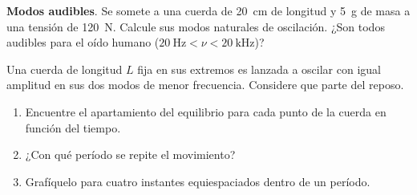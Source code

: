 \item \textbf{Modos audibles}.
Se somete a una cuerda de \SI{20}{\centi\metre} de longitud y \SI{5}{\gram} de masa a una tensión de \SI{120}{\newton}.
Calcule sus modos naturales de oscilación.
¿Son todos audibles para el oído humano (\(\SI{20}{\hertz} < \nu < \SI{20}{\kilo\hertz}\))?



\item Una cuerda de longitud $L$ fija en sus extremos es lanzada a oscilar con igual amplitud en sus dos modos de menor frecuencia.
Considere que parte del reposo. 
\begin{enumerate}
	\item Encuentre el apartamiento del equilibrio para cada punto de la cuerda en función del tiempo.
	\item ¿Con qué período se repite el movimiento?
	\item Grafíquelo para cuatro instantes equiespaciados dentro de un período. 
\end{enumerate}


